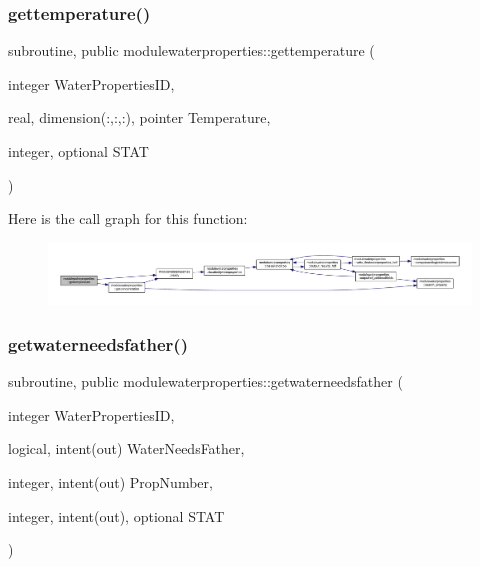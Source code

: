 \subsubsection{\texorpdfstring{gettemperature()}{gettemperature()}}
{\footnotesize\ttfamily subroutine, public modulewaterproperties\+::gettemperature (\begin{DoxyParamCaption}\item[{integer}]{Water\+Properties\+ID,  }\item[{real, dimension(\+:,\+:,\+:), pointer}]{Temperature,  }\item[{integer, optional}]{S\+T\+AT }\end{DoxyParamCaption})}

Here is the call graph for this function\+:\nopagebreak
\begin{figure}[H]
\begin{center}
\leavevmode
\includegraphics[width=350pt]{namespacemodulewaterproperties_a98876d77f6e973aec7cd3341346e8d8b_cgraph}
\end{center}
\end{figure}
\mbox{\label{namespacemodulewaterproperties_a97df80c3a8c997c208dac464d58c0f8c}} 
\subsubsection{\texorpdfstring{getwaterneedsfather()}{getwaterneedsfather()}}
{\footnotesize\ttfamily subroutine, public modulewaterproperties\+::getwaterneedsfather (\begin{DoxyParamCaption}\item[{integer}]{Water\+Properties\+ID,  }\item[{logical, intent(out)}]{Water\+Needs\+Father,  }\item[{integer, intent(out)}]{Prop\+Number,  }\item[{integer, intent(out), optional}]{S\+T\+AT }\end{DoxyParamCaption})}

